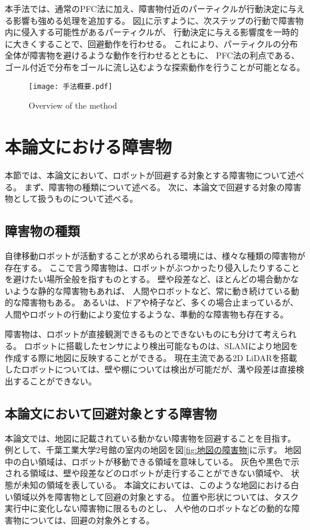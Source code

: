 本手法では、通常のPFC法に加え、障害物付近のパーティクルが行動決定に与える影響も強める処理を追加する。
図\ref{fig:手法概要}に示すように、次ステップの行動で障害物内に侵入する可能性があるパーティクルが、
行動決定に与える影響度を一時的に大きくすることで、回避動作を行わせる。
これにより、パーティクルの分布全体が障害物を避けるような動作を行わせるとともに、
PFC法の利点である、ゴール付近で分布をゴールに流し込むような探索動作を行うことが可能となる。

\begin{figure}[H]
  \begin{center}
    \texttt{[image: 手法概要.pdf]}
    \caption{Overview of the method}
    \label{fig:手法概要}
  \end{center}
\end{figure}


\section{本論文における障害物} \label{section:障害物}
本節では、本論文において、ロボットが回避する対象とする障害物について述べる。
まず、障害物の種類について述べる。
次に、本論文で回避する対象の障害物として扱うものについて述べる。

\subsection{障害物の種類}
自律移動ロボットが活動することが求められる環境には、様々な種類の障害物が存在する。
ここで言う障害物は、ロボットがぶつかったり侵入したりすることを避けたい場所全般を指すものとする。
壁や段差など、ほとんどの場合動かないような静的な障害物もあれば、
人間やロボットなど、常に動き続けている動的な障害物もある。
あるいは、ドアや椅子など、多くの場合止まっているが、人間やロボットの行動により変位するような、準動的な障害物も存在する。

障害物は、ロボットが直接観測できるものとできないものにも分けて考えられる。
ロボットに搭載したセンサにより検出可能なものは、SLAMにより地図を作成する際に地図に反映することができる。
現在主流である2D LiDARを搭載したロボットについては、壁や棚については検出が可能だが、溝や段差は直接検出することができない。

\subsection{本論文において回避対象とする障害物}
本論文では、地図に記載されている動かない障害物を回避することを目指す。
例として、千葉工業大学2号館の室内の地図を図\ref{fig:地図の障害物}に示す。
地図中の白い領域は、ロボットが移動できる領域を意味している。
灰色や黒色で示される領域は、壁や段差などのロボットが走行することができない領域や、
状態が未知の領域を表している。
本論文においては、このような地図における白い領域以外を障害物として回避の対象とする。
位置や形状については、タスク実行中に変化しない障害物に限るものとし、
人や他のロボットなどの動的な障害物については、回避の対象外とする。

